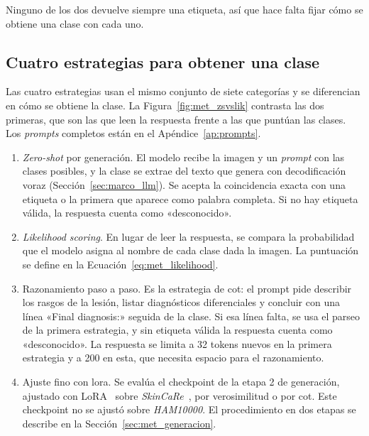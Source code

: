 Ninguno de los dos devuelve siempre una etiqueta, así que hace falta fijar cómo se obtiene una clase con cada uno.

\subsection{Cuatro estrategias para obtener una clase}
\label{sec:met_vlm_estrategias}

Las cuatro estrategias usan el mismo conjunto de siete categorías y se diferencian en cómo se obtiene la clase. La
Figura~\ref{fig:met_zsvslik} contrasta las dos primeras, que son las que leen la respuesta frente a las que puntúan las
clases. Los \emph{prompts} completos están en el Apéndice~\ref{ap:prompts}.

\begin{enumerate}[leftmargin=1.6em]
  \item \emph{Zero-shot} por generación. El modelo recibe la imagen y un \emph{prompt} con las clases posibles, y la
  clase se extrae del texto que genera con decodificación voraz (Sección~\ref{sec:marco_llm}). Se acepta la coincidencia
  exacta con una etiqueta o la primera que aparece como palabra completa. Si no hay etiqueta válida, la respuesta cuenta
  como «desconocido».
  \item \emph{Likelihood scoring}. En lugar de leer la respuesta, se compara la probabilidad que el modelo asigna al
  nombre de cada clase dada la imagen. La puntuación se define en la Ecuación~\ref{eq:met_likelihood}.
  \item Razonamiento paso a paso. Es la estrategia de \gls{cot}: el prompt pide describir los rasgos de la
  lesión, listar diagnósticos diferenciales y concluir con una línea «Final diagnosis:» seguida de la clase. Si esa línea
  falta, se usa el parseo de la primera estrategia, y sin etiqueta válida la respuesta cuenta como «desconocido».
  La respuesta se limita a 32 tokens nuevos en la primera estrategia y a 200 en esta, que necesita espacio para el
  razonamiento.
  \item Ajuste fino con \gls{lora}. Se evalúa el checkpoint de la etapa 2 de generación, ajustado con LoRA~\cite{hu2021lora}
  sobre \emph{SkinCaRe}~\cite{shen2025skincare}, por verosimilitud o por \gls{cot}.
  Este checkpoint no se ajustó sobre \emph{HAM10000}. El procedimiento en dos etapas se describe en la
  Sección~\ref{sec:met_generacion}.
\end{enumerate}



